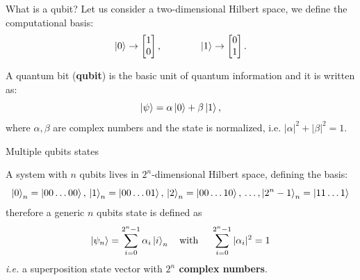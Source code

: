 \documentclass[aspectratio=169, 10pt, xcolor={svgnames}, hyperref={linkcolor=black}]{beamer}
\begin{document}
\begin{frame}[fragile]{What is a qubit?}
   \pause
   Let us consider a two-dimensional {\color{blue}Hilbert space}, we define the computational basis:
   \begin{equation*}
   \ket{0} \rightarrow  \begin{bmatrix} 1 \\ 0 \end{bmatrix}, \qquad \qquad
   \ket{1} \rightarrow  \begin{bmatrix} 0 \\ 1 \end{bmatrix}.
   \end{equation*}

   A {\color{red}quantum bit} (\textbf{qubit}) is the basic unit of quantum information and it is written as:
   \begin{equation*}
   \ket{\psi}=\alpha\ket{0} +\beta\ket{1},
   \end{equation*}
   where $\alpha, \beta$ are {\color{violet}complex numbers} and the {\color{blue}state is normalized}, i.e. $|\alpha|^2+|\beta|^2=1$.


 \end{frame}

 \begin{frame}[fragile]{Multiple qubits states}

 A system with $n$ qubits lives in {\color{red}$2^n$-dimensional Hilbert space}, defining the basis:
 \begin{equation*}
 \ket{0}_n = \ket{00\dots0 0},\, \ket{1}_n = \ket{00\dots01},\, \ket{2}_n = \ket{00\dots10}, \, \dots, \ket{2^n -1}_n = \ket{11\dots1}
 \end{equation*}
 therefore a generic $n$ qubits state is defined as
 \begin{equation*}
 \ket{\psi_n}= \sum_{i=0}^{2^n-1} \alpha_i \ket{i}_n \quad \text{with } \quad  \sum_{i=0}^{2^n-1} |\alpha_i |^2 = 1
 \end{equation*}
 \textit{i.e.} a {\color{blue}superposition state vector} with \textbf{$2^n$ complex numbers}.

 \end{frame}
\end{document}
